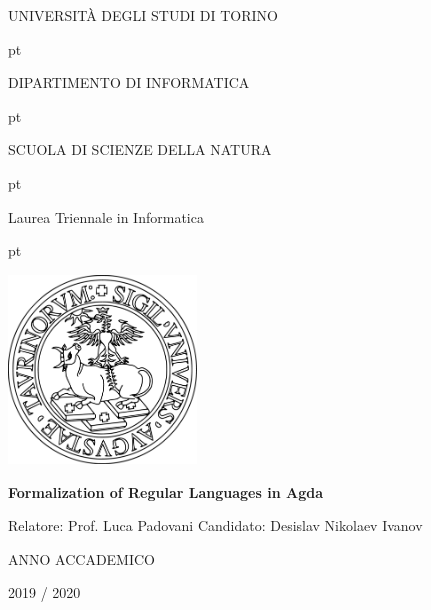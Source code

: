 
\begin{titlepage}

\centerline {\Large{\textsc{ UNIVERSIT\`A DEGLI STUDI DI TORINO}}}
 pt

\centerline {\Large{\textsc DIPARTIMENTO DI INFORMATICA}}

 pt

\centerline {{\textsc SCUOLA DI SCIENZE DELLA NATURA}}

 pt

\centerline {\Large{\textsc Laurea Triennale in Informatica}}


 pt



\centerline {\includegraphics[width=5cm]{logohd.png}}

\vskip 1.2cm

\vskip 0.7cm

\centerline {\Large {\bf Formalization of Regular Languages in Agda}}

\vskip 1.7cm


\noindent Relatore: Prof. Luca Padovani
\hfill  {Candidato: Desislav Nikolaev Ivanov}



\vskip 2.3cm
\centerline{ANNO ACCADEMICO}
\centerline{2019 / 2020}
\end{titlepage}
\restoregeometry   